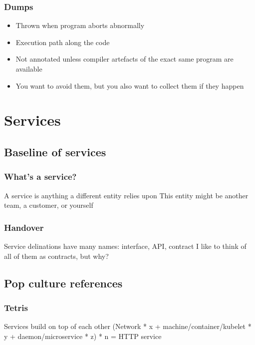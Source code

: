 \documentclass[t]{beamer}
\begin{document}
\begin{frame}
	\frametitle{Dumps}
	\begin{itemize}
		\item Thrown when program aborts abnormally
		\item Execution path along the code
		\item Not annotated unless compiler artefacts of the exact same program are available
		\item You want to avoid them, but you also want to collect them if they happen
	\end{itemize}
\end{frame}



\section{Services}


\subsection{Baseline of services}

\begin{frame}
	\frametitle{What's a service?}
	\begin{center}
		\vfill
		A service is anything a different entity relies upon
		\vfill
		This entity might be another team, a customer, or yourself
		\vfill
	\end{center}
\end{frame}

\begin{frame}
	\frametitle{Handover}
	\begin{center}
		\vfill
		Service delinations have many names: interface, API, contract
		\vfill
		I like to think of all of them as contracts, but why?
		\vfill
	\end{center}
\end{frame}


\subsection{Pop culture references}

\begin{frame}
	\frametitle{Tetris}
	\begin{center}
		\vfill
		Services build on top of each other
		\vfill
		(Network * x + machine/container/kubelet * y + daemon/microservice * z) * n = HTTP service
		\vfill
	\end{center}
\end{frame}
\end{document}
